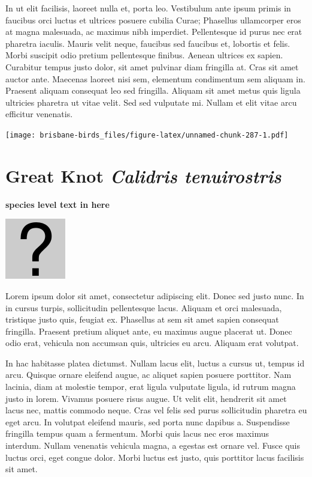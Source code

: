 \documentclass[]{book}
\let\origfigure\figure
\let\endorigfigure\endfigure
\renewenvironment{figure}[1][2] {
  \expandafter\origfigure\expandafter[H]
} {
  \endorigfigure
}
\begin{document}
In ut elit facilisis, laoreet nulla et, porta leo. Vestibulum ante ipsum
primis in faucibus orci luctus et ultrices posuere cubilia Curae;
Phasellus ullamcorper eros at magna malesuada, ac maximus nibh
imperdiet. Pellentesque id purus nec erat pharetra iaculis. Mauris velit
neque, faucibus sed faucibus et, lobortis et felis. Morbi suscipit odio
pretium pellentesque finibus. Aenean ultrices ex sapien. Curabitur
tempus justo dolor, sit amet pulvinar diam fringilla at. Cras sit amet
auctor ante. Maecenas laoreet nisi sem, elementum condimentum sem
aliquam in. Praesent aliquam consequat leo sed fringilla. Aliquam sit
amet metus quis ligula ultricies pharetra ut vitae velit. Sed sed
vulputate mi. Nullam et elit vitae arcu efficitur venenatis.

\begin{figure}
\centering
\texttt{[image: brisbane-birds\_files/figure-latex/unnamed-chunk-287-1.pdf]}
\caption{\label{fig:unnamed-chunk-287}insert figure caption}
\end{figure}

\section{\texorpdfstring{Great Knot \emph{Calidris
tenuirostris}}{Great Knot Calidris tenuirostris}}\label{great-knot-calidris-tenuirostris}

\textbf{species level text in here}

\begin{figure}
\centering
\includegraphics{assets/missing.png}
\caption{No image for species}
\end{figure}

Lorem ipsum dolor sit amet, consectetur adipiscing elit. Donec sed justo
nunc. In in cursus turpis, sollicitudin pellentesque lacus. Aliquam et
orci malesuada, tristique justo quis, feugiat ex. Phasellus at sem sit
amet sapien consequat fringilla. Praesent pretium aliquet ante, eu
maximus augue placerat ut. Donec odio erat, vehicula non accumsan quis,
ultricies eu arcu. Aliquam erat volutpat.

In hac habitasse platea dictumst. Nullam lacus elit, luctus a cursus ut,
tempus id arcu. Quisque ornare eleifend augue, ac aliquet sapien posuere
porttitor. Nam lacinia, diam at molestie tempor, erat ligula vulputate
ligula, id rutrum magna justo in lorem. Vivamus posuere risus augue. Ut
velit elit, hendrerit sit amet lacus nec, mattis commodo neque. Cras vel
felis sed purus sollicitudin pharetra eu eget arcu. In volutpat eleifend
mauris, sed porta nunc dapibus a. Suspendisse fringilla tempus quam a
fermentum. Morbi quis lacus nec eros maximus interdum. Nullam venenatis
vehicula magna, a egestas est ornare vel. Fusce quis luctus orci, eget
congue dolor. Morbi luctus est justo, quis porttitor lacus facilisis sit
amet.
\end{document}

